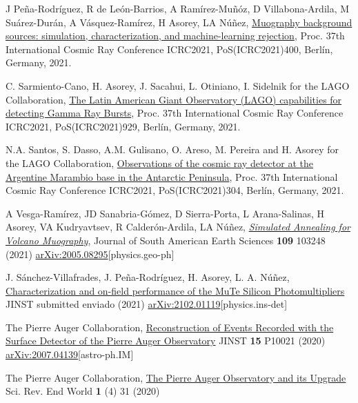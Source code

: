 \begin{etaremune}
\item {} J Peña-Rodríguez, R de León-Barrios, A Ramírez-Muñóz, D Villabona-Ardila, M Suárez-Durán, A Vásquez-Ramírez, H Asorey, LA Núñez, \href{https://doi.org/10.22323/1.395.0400}{Muography background sources: simulation, characterization, and machine-learning rejection}, \en Proc. 37th International Cosmic Ray Conference ICRC2021, PoS(ICRC2021)400, Berlín, Germany, 2021.

\item {} C. Sarmiento-Cano, H. Asorey, J. Sacahui, L. Otiniano, I. Sidelnik for the LAGO Collaboration, \href{https://doi.org/10.22323/1.395.0929}{The Latin American Giant Observatory (LAGO) capabilities for detecting Gamma Ray Bursts}, \en Proc. 37th International Cosmic Ray Conference ICRC2021, PoS(ICRC2021)929, Berlín, Germany, 2021.

\item {} N.A. Santos, S. Dasso, A.M. Gulisano, O. Areso, M. Pereira and H. Asorey for the LAGO Collaboration, \href{https://doi.org/10.22323/1.395.304}{Observations of the cosmic ray detector at the Argentine Marambio base in the Antarctic Peninsula}, \en Proc. 37th International Cosmic Ray Conference ICRC2021, PoS(ICRC2021)304, Berlín, Germany, 2021.

\item {} A Vesga-Ramírez, JD Sanabria-Gómez, D Sierra-Porta, L Arana-Salinas, H Asorey, VA Kudryavtsev, R Calderón-Ardila, LA Núñez, \href{https://doi.org/10.1016/j.jsames.2021.103248}{\emph{Simulated Annealing for Volcano Muography}}, Journal of South American Earth Sciences {\bf{109}} 103248 (2021) \href{https://arxiv.org/abs/2005.08295}{arXiv:2005.08295}[physics.geo-ph]

\item {} J. Sánchez-Villafrades, J. Peña-Rodríguez, H. Asorey, L. A. Núñez, \href{}{Characterization and on-field performance of the MuTe Silicon Photomultipliers} JINST \ifeng submitted \else enviado \fi (2021) \href{https://arxiv.org/abs/2102.01119}{arXiv:2102.01119}[physics.ins-det]

\item {}The Pierre Auger Collaboration, \href{https://doi.org/10.1088/1748-0221/15/10/P10021}{Reconstruction of Events Recorded with the Surface Detector of the Pierre Auger Observatory} JINST {\bf{15}} P10021 (2020) \href{https://arxiv.org/abs/2007.04139}{arXiv:2007.04139}[astro-ph.IM]

\item {}The Pierre Auger Collaboration, \href{https://doi.org/10.52712/sciencereviews.v1i4.31}{The Pierre Auger Observatory and its Upgrade} Sci. Rev. End World {\bf{1}} (4) 31 (2020)


\end{etaremune}

